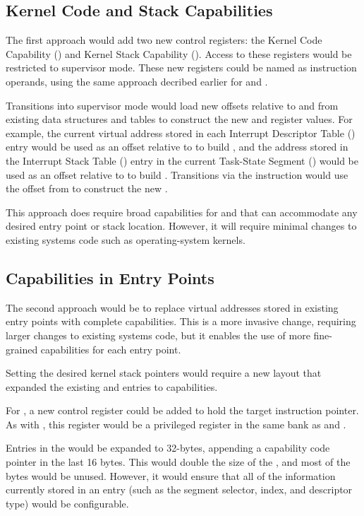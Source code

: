 \subsection{Kernel Code and Stack Capabilities}

The first approach would add two new control registers: the Kernel
Code Capability (\KCC{}) and Kernel Stack Capability (\KSC{}).  Access to
these registers would be restricted to supervisor mode.  These new registers
could be named as instruction operands, using the same approach decribed
earlier for \CFS{} and \CGS{}.

Transitions into
supervisor mode would load new offsets relative to \KCC{} and \KSC{} from
existing data structures and tables to construct the new \CIP{} and \CSP{}
register values.  For example, the current virtual address stored in
each Interrupt Descriptor Table (\IDT{}) entry would be used as an offset
relative to \KCC{} to build \CIP{}, and the address stored in the Interrupt
Stack Table (\IST{}) entry in the current Task-State Segment (\TSS{}) would
be used as an offset relative to \KSC{} to build \CSP{}.  Transitions via
the  instruction would use the offset from \LSTAR{} to
construct the new \CIP{}.

This approach does require broad capabilities
for \KCC{} and \KSC{} that can accommodate any desired entry point or stack
location.  However, it will require minimal changes to existing systems
code such as operating-system kernels.

\subsection{Capabilities in Entry Points}

The second approach would be to replace virtual addresses stored in
existing entry points with complete capabilities.  This is a more
invasive change, requiring larger changes to existing systems code, but
it enables the use of more fine-grained capabilities for each entry
point.

Setting the desired kernel stack pointers \CSP{} would require a new
\TSS{} layout that expanded the existing \RSP{} and \IST{} entries to
capabilities.

For , a new control register \CSTAR{} could be
added to hold the target instruction pointer.  As with \KCC{},
this register would be a privileged register in the same bank as
\CFS{} and \CGS{}.

Entries in the \IDT{} would be expanded to 32-bytes, appending a capability
code pointer in the last 16 bytes.  This would double the size of the
\IDT{}, and most of the bytes would be unused.  However, it would
ensure that all of the information currently stored in an \IDT{} entry
(such as the segment selector, \IST{} index, and descriptor type) would
be configurable.

